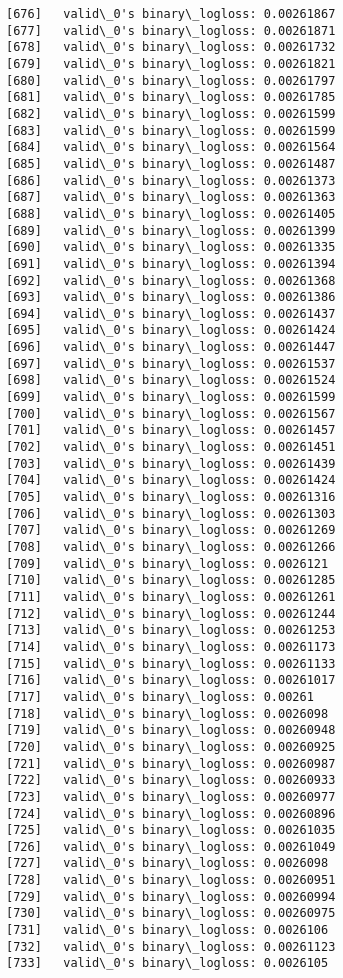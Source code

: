 \documentclass[11pt]{article}
\begin{document}
\begin{Verbatim}[commandchars=\\\{\}]
[676]	valid\_0's binary\_logloss: 0.00261867
[677]	valid\_0's binary\_logloss: 0.00261871
[678]	valid\_0's binary\_logloss: 0.00261732
[679]	valid\_0's binary\_logloss: 0.00261821
[680]	valid\_0's binary\_logloss: 0.00261797
[681]	valid\_0's binary\_logloss: 0.00261785
[682]	valid\_0's binary\_logloss: 0.00261599
[683]	valid\_0's binary\_logloss: 0.00261599
[684]	valid\_0's binary\_logloss: 0.00261564
[685]	valid\_0's binary\_logloss: 0.00261487
[686]	valid\_0's binary\_logloss: 0.00261373
[687]	valid\_0's binary\_logloss: 0.00261363
[688]	valid\_0's binary\_logloss: 0.00261405
[689]	valid\_0's binary\_logloss: 0.00261399
[690]	valid\_0's binary\_logloss: 0.00261335
[691]	valid\_0's binary\_logloss: 0.00261394
[692]	valid\_0's binary\_logloss: 0.00261368
[693]	valid\_0's binary\_logloss: 0.00261386
[694]	valid\_0's binary\_logloss: 0.00261437
[695]	valid\_0's binary\_logloss: 0.00261424
[696]	valid\_0's binary\_logloss: 0.00261447
[697]	valid\_0's binary\_logloss: 0.00261537
[698]	valid\_0's binary\_logloss: 0.00261524
[699]	valid\_0's binary\_logloss: 0.00261599
[700]	valid\_0's binary\_logloss: 0.00261567
[701]	valid\_0's binary\_logloss: 0.00261457
[702]	valid\_0's binary\_logloss: 0.00261451
[703]	valid\_0's binary\_logloss: 0.00261439
[704]	valid\_0's binary\_logloss: 0.00261424
[705]	valid\_0's binary\_logloss: 0.00261316
[706]	valid\_0's binary\_logloss: 0.00261303
[707]	valid\_0's binary\_logloss: 0.00261269
[708]	valid\_0's binary\_logloss: 0.00261266
[709]	valid\_0's binary\_logloss: 0.0026121
[710]	valid\_0's binary\_logloss: 0.00261285
[711]	valid\_0's binary\_logloss: 0.00261261
[712]	valid\_0's binary\_logloss: 0.00261244
[713]	valid\_0's binary\_logloss: 0.00261253
[714]	valid\_0's binary\_logloss: 0.00261173
[715]	valid\_0's binary\_logloss: 0.00261133
[716]	valid\_0's binary\_logloss: 0.00261017
[717]	valid\_0's binary\_logloss: 0.00261
[718]	valid\_0's binary\_logloss: 0.0026098
[719]	valid\_0's binary\_logloss: 0.00260948
[720]	valid\_0's binary\_logloss: 0.00260925
[721]	valid\_0's binary\_logloss: 0.00260987
[722]	valid\_0's binary\_logloss: 0.00260933
[723]	valid\_0's binary\_logloss: 0.00260977
[724]	valid\_0's binary\_logloss: 0.00260896
[725]	valid\_0's binary\_logloss: 0.00261035
[726]	valid\_0's binary\_logloss: 0.00261049
[727]	valid\_0's binary\_logloss: 0.0026098
[728]	valid\_0's binary\_logloss: 0.00260951
[729]	valid\_0's binary\_logloss: 0.00260994
[730]	valid\_0's binary\_logloss: 0.00260975
[731]	valid\_0's binary\_logloss: 0.0026106
[732]	valid\_0's binary\_logloss: 0.00261123
[733]	valid\_0's binary\_logloss: 0.0026105

\end{Verbatim}
\end{document}
